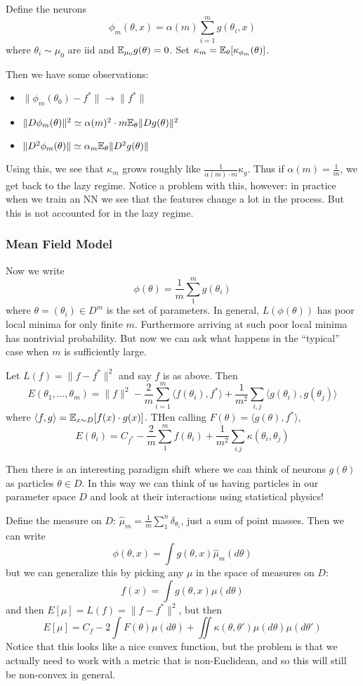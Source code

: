 \documentclass[12pt]{article}
\begin{document}
Define the neurons
\[\phi_m(\theta,x)=\alpha(m)\sum_{i=1}^mg(\theta_i,x)\]
where $\theta_i\sim  \mu_0$ are iid and $\mathbb{E}_{\mu_0}g(\theta)=0$. Set $\kappa_m=\mathbb{E}_\theta[\kappa_{\phi_m}(\theta)]$.

Then we have some observations:
\begin{itemize}
	\item $\|\phi_m(\theta_0)-f^\ast\|\to\|f^\ast\|$
	\item $\|D\phi_m(\theta)\|^2\simeq \alpha(m)^2\cdot m\mathbb{E}_\theta\|Dg(\theta)\|^2$
	\item $\|D^2\phi_m(\theta)\|\simeq \alpha_m\mathbb{E}_\theta\|D^2 g(\theta)\|$
\end{itemize}
Using this, we see that $\kappa_m$ grows roughly like $\frac{1}{\alpha(m)\cdot m}\kappa_g$. Thus if $\alpha(m)=\frac{1}{m}$, we get back to the lazy regime. Notice a problem with this, however: 
in practice when we train an NN we see that the features change a lot in the process. But this is not accounted for in the lazy regime.

\subsubsection{Mean Field Model}
Now we write 
\[\phi(\theta)=\frac{1}{m}\sum_1^mg(\theta_i)\]
where $\theta=(\theta_i)\in D^m$ is the set of parameters. In general, $L(\phi(\theta))$ has poor local minima for only finite $m$. Furthermore arriving at such poor local minima has nontrivial probability.
But now we can ask what happens in the ``typical'' case when $m$ is sufficiently large. 

Let $L(f)=\|f-f^\ast\|^2$ and say $f$ is as above. Then 
\[E(\theta_1,\dots,\theta_m)=\|f\|^2-\frac{2}{m}\sum_{i=1}^m\langle f(\theta_i),f^\ast\rangle +\frac{1}{m^2}\sum_{i,j}\langle g(\theta_i),g(\theta_j)\rangle\]
where $\langle f,g\rangle=\mathbb{E}_{x\sim D}[f(x)\cdot g(x)]$. THen calling $F(\theta)=\langle g(\theta), f^\ast\rangle$,
\[E(\theta_i)= C_{f^\ast}-\frac{2}{m}\sum_1^m f(\theta_i)+\frac{1}{m^2}\sum_{i.j}\kappa(\theta_i,\theta_j)\]

Then there is an interesting paradigm shift where we can think of neurons $g(\theta)$ as particles $\theta\in D$. In this way we can think of us having particles in our parameter space $D$
and look at their interactions using statistical physics!

Define the measure on $D$: $\hat\mu_m=\frac{1}{m}\sum_1^n\delta_{\theta_i}$, just a sum of point masses. Then we can write 
\[\phi(\theta,x)=\int g(\theta,x)\hat\mu_m(d\theta)\]
but we can generalize this by picking any $\mu$ in the space of measures on $D$:
\[f(x)=\int g(\theta,x)\mu(d\theta)\]
and then $E[\mu]=L(f)=\|f-f^\ast\|^2$, but then 
\[E[\mu]=C_f-2\int F(\theta)\mu(d\theta)+\iint\kappa(\theta,\theta')\mu(d\theta)\mu(d\theta')\]
Notice that this looks like a nice convex function, but the problem is that we actually need to work with a metric that is non-Euclidean, and so this will still be non-convex in general.
\end{document}
